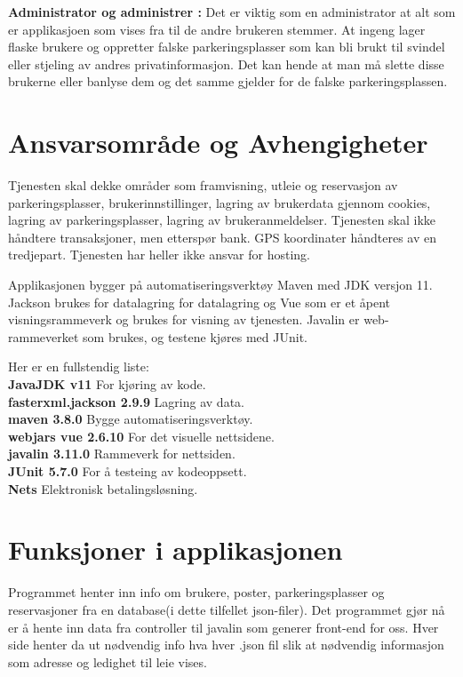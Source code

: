 \documentclass[12pt]{article}
\begin{document}
    \textbf{Administrator og administrer :} Det er viktig som en administrator at alt som er applikasjoen som vises fra til de andre brukeren stemmer. At ingeng lager flaske brukere og oppretter falske parkeringsplasser som kan bli brukt til svindel eller stjeling av andres privatinformasjon. Det kan hende at man må slette disse brukerne eller banlyse dem og det samme gjelder for de falske parkeringsplassen. 


\section{Ansvarsområde og Avhengigheter}
Tjenesten skal dekke områder som framvisning, utleie og reservasjon av parkeringsplasser, brukerinnstillinger, lagring av brukerdata gjennom cookies, lagring av parkeringsplasser, lagring av brukeranmeldelser. Tjenesten skal ikke håndtere transaksjoner, men etterspør bank. GPS koordinater håndteres av en tredjepart. Tjenesten har heller ikke ansvar for hosting.

Applikasjonen bygger på automatiseringsverktøy Maven med JDK versjon 11. Jackson brukes for datalagring for datalagring og Vue som er et åpent visningsrammeverk og brukes for visning av tjenesten. Javalin er web-rammeverket som brukes, og testene kjøres med JUnit.

Her er en fullstendig liste:\\
\textbf{JavaJDK v11} For kjøring av kode.
\\\textbf{fasterxml.jackson 2.9.9} Lagring av data.
\\\textbf{maven 3.8.0} Bygge automatiseringsverktøy.
\\\textbf{webjars vue 2.6.10} For det visuelle nettsidene.
\\\textbf{javalin 3.11.0} Rammeverk for nettsiden.
\\\textbf{JUnit 5.7.0} For å testeing av kodeoppsett.
\\\textbf{Nets} Elektronisk betalingsløsning. 


\section{Funksjoner i applikasjonen}

Programmet henter inn info om brukere, poster, parkeringsplasser og reservasjoner fra en database(i dette tilfellet json-filer). Det programmet gjør nå er å hente inn data fra controller til javalin som generer front-end for oss. Hver side henter da ut nødvendig info hva hver .json fil slik at nødvendig informasjon som adresse og ledighet til leie vises.
\end{document}
